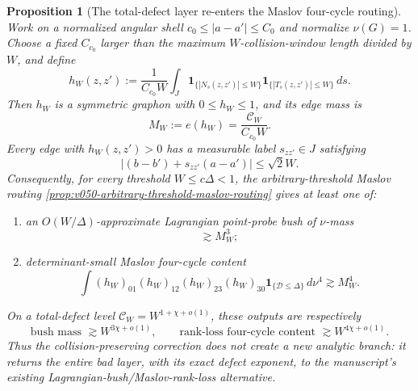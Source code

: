 \documentclass[10pt]{article}
\newtheorem{proposition}[theorem]{Proposition}
\begin{document}
\begin{proposition}[The total-defect layer re-enters the Maslov four-cycle routing]
\label{prop:v057-total-defect-four-cycle-return}
Work on a normalized angular shell
\(c_0\le|a-a'|\le C_0\) and normalize \(\nu(G)=1\).  Choose a fixed
\(C_{c_0}\) larger than the maximum \(W\)-collision-window length divided by \(W\), and define
\begin{equation}
\label{eq:v057-normalized-maslov-graphon}
h_W(z,z')
:=
\frac1{C_{c_0}W}
\int_J
\mathbf 1_{\{|N_s(z,z')|\le W\}}
\mathbf 1_{\{|T_s(z,z')|\le W\}}
\,ds.
\end{equation}
Then \(h_W\) is a symmetric graphon with \(0\le h_W\le1\), and its edge mass is
\begin{equation}
\label{eq:v057-normalized-maslov-edge-mass}
\boxed{
M_W:=e(h_W)
=
\frac{\mathcal C_W}{C_{c_0}W}.
}
\end{equation}
Every edge with \(h_W(z,z')>0\) has a measurable label \(s_{zz'}\in J\) satisfying
\begin{equation}
\label{eq:v057-return-edge-contact-relation}
|(b-b')+s_{zz'}(a-a')|
\le
\sqrt2W.
\end{equation}
Consequently, for every threshold \(W\le c\Delta<1\), the arbitrary-threshold Maslov routing
\cref{prop:v050-arbitrary-threshold-maslov-routing} gives at least one of:
\begin{enumerate}[label=\textnormal{(\roman*)}]
\item an \(O(W/\Delta)\)-approximate Lagrangian point-probe bush of \(\nu\)-mass
\begin{equation}
\label{eq:v057-total-defect-bush-output}
\boxed{\gtrsim M_W^3;}
\end{equation}
\item determinant-small Maslov four-cycle content
\begin{equation}
\label{eq:v057-total-defect-rank-output}
\boxed{
\int
(h_W)_{01}(h_W)_{12}(h_W)_{23}(h_W)_{30}
\mathbf 1_{\{\mathcal D\le\Delta\}}\,d\nu^4
\gtrsim M_W^4.
}
\end{equation}
\end{enumerate}
On a total-defect level \(\mathcal C_W=W^{1+\chi+o(1)}\), these outputs are respectively
\begin{equation}
\label{eq:v057-total-defect-four-cycle-powers}
\boxed{
\text{bush mass }\gtrsim W^{3\chi+o(1)},
\qquad
\text{rank-loss four-cycle content }\gtrsim W^{4\chi+o(1)}.
}
\end{equation}
Thus the collision-preserving correction does not create a new analytic branch: it returns the
entire bad layer, with its exact defect exponent, to the manuscript's existing
Lagrangian-bush/Maslov-rank-loss alternative.
\end{proposition}
\end{document}
